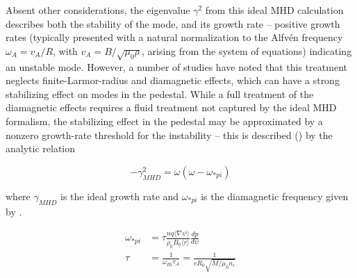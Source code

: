 \begin{figure}[t]
 \pushtooutside
\end{figure}

Absent other considerations, the eigenvalue $\gamma^2$ from this ideal MHD calculation describes both the stability of the mode, and its growth rate -- positive growth rates (typically presented with a natural normalization to the Alfv\'en frequency $\omega_A = v_A/R$, with $v_A = B/\sqrt{\mu_0 \rho}$, arising from the system of equations) indicating an unstable mode.  However, a number of studies \cite{Rogers1999,Huysmans2001,Snyder2003} have noted that this treatment neglects finite-Larmor-radius and diamagnetic effects, which can have a strong stabilizing effect on modes in the pedestal.  While a full treatment of the diamagnetic effects requires a fluid treatment not captured by the ideal MHD formalism, the stabilizing effect in the pedestal may be approximated by a nonzero growth-rate threshold for the instability -- this is described (\cf \cite{Snyder2002}) by the analytic relation

\begin{equation}\label{eq:pb_diamag}
 -\gamma_{MHD}^2 = \omega(\omega - \omega_{*pi})
\end{equation}

\noindent where $\gamma_{MHD}$ is the ideal growth rate and $\omega_{*pi}$ is the diamagnetic frequency given by \cite{Snyder2009,Huysmans2001}.

\begin{equation}\label{eq:omegastar}
 \begin{aligned}
  \omega_{*pi} &= \tau \frac{nq \langle \nabla \psi \rangle}{\rho_0 B_0 \langle r \rangle} \frac{dp}{d\psi}\\
  \tau &= \frac{1}{\omega_{Bi} \tau_A} = \frac{1}{eR_0 \sqrt{M/\mu_0 n_i}}
 \end{aligned}
\end{equation}


